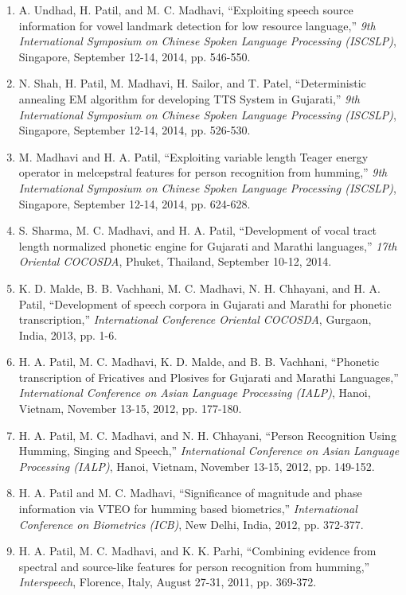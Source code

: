 \documentclass[10pt]{article}
\begin{document}
\begin{enumerate}[resume]
\item A. Undhad, H. Patil, and M. C. Madhavi, ``Exploiting speech source information for vowel landmark detection for low resource language,'' \textit{9th International Symposium on Chinese Spoken Language Processing (ISCSLP)}, Singapore, September 12-14, 2014, pp. 546-550.

\item N. Shah, H. Patil, M. Madhavi, H. Sailor, and T. Patel, ``Deterministic annealing EM algorithm for developing TTS System in Gujarati,'' \textit{9th International Symposium on Chinese Spoken Language Processing (ISCSLP)}, Singapore, September 12-14, 2014, pp. 526-530.

\item M. Madhavi and H. A. Patil, ``Exploiting variable length Teager energy operator in melcepstral features for person recognition from humming,'' \textit{9th International Symposium on Chinese Spoken Language Processing (ISCSLP)}, Singapore, September 12-14, 2014, pp. 624-628.

\item S. Sharma, M. C. Madhavi, and H. A. Patil, ``Development of vocal tract length normalized phonetic engine for Gujarati and Marathi languages,'' \textit{17th Oriental COCOSDA}, Phuket, Thailand, September 10-12, 2014.

\item K. D. Malde, B. B. Vachhani, M. C. Madhavi, N. H. Chhayani, and H. A. Patil, ``Development of speech corpora in Gujarati and Marathi for phonetic transcription,'' \textit{International Conference Oriental COCOSDA}, Gurgaon, India, 2013, pp. 1-6.

\item H. A. Patil, M. C. Madhavi, K. D. Malde, and B. B. Vachhani, ``Phonetic transcription of Fricatives and Plosives for Gujarati and Marathi Languages,'' \textit{International Conference on Asian Language Processing (IALP)}, Hanoi, Vietnam, November 13-15, 2012, pp. 177-180.

\item H. A. Patil, M. C. Madhavi, and N. H. Chhayani, ``Person Recognition Using Humming, Singing and Speech,'' \textit{International Conference on Asian Language Processing (IALP)}, Hanoi, Vietnam, November 13-15, 2012, pp. 149-152.

\item H. A. Patil and M. C. Madhavi, ``Significance of magnitude and phase information via VTEO for humming based biometrics,'' \textit{International Conference on Biometrics (ICB)}, New Delhi, India, 2012, pp. 372-377.

\item H. A. Patil, M. C. Madhavi, and K. K. Parhi, ``Combining evidence from spectral and source-like features for person recognition from humming,'' \textit{Interspeech}, Florence, Italy, August 27-31, 2011, pp. 369-372.
\end{enumerate}
\end{document}
